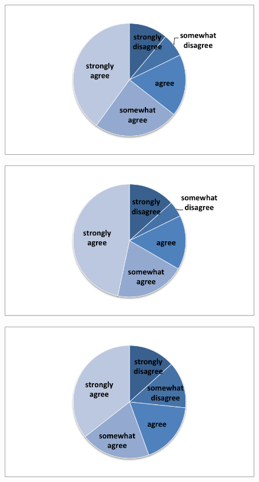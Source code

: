 \begin{figure}[h]
\includegraphics{SurveyFig1}
\label{fig:SFig1}
\end{figure}
\begin{figure}[h]
\includegraphics{SurveyFig2}
\label{fig:SFig2}
\end{figure}
\begin{figure}[h]
\includegraphics{SurveyFig3}
\label{fig:SFig3}
\end{figure}


